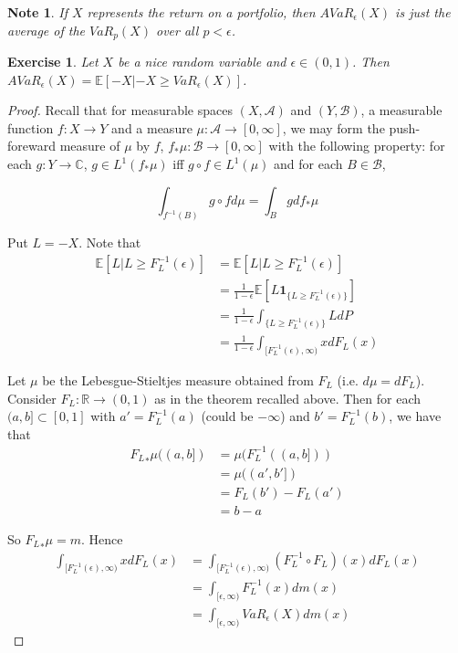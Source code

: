 \documentclass[12pt]{amsart}
\newtheorem{note}[thm]{Note}
\newtheorem{ex}[thm]{Exercise}
\newcommand{\ep}{\epsilon}
\newcommand{\C}{\mathbb{C}}
\newcommand{\E}{\mathbb{E}}
\newcommand{\R}{\mathbb{R}}
\newcommand{\MA}{\mathcal{A}}
\newcommand{\MB}{\mathcal{B}}
\newcommand{\RG}{[0,\infty]}
\begin{document}
\begin{note}
If $X$ represents the return on a portfolio, then $AVaR_{\ep}(X)$ is just the average of the $VaR_{p}(X)$ over all $p< \ep$.
\end{note}

\begin{ex}
Let $X$ be a nice random variable and $\ep \in (0,1)$. Then $AVaR_{\ep}(X) = \E[-X|-X \geq VaR_{\ep}(X)]$.
\end{ex}

\begin{proof}
Recall that for measurable spaces $(X,\MA)$ and $(Y, \MB)$, a measurable function $f:X \rightarrow Y$ and a measure $\mu:\MA \rightarrow \RG$, we may form the push-foreward measure of $\mu$ by $f$, $f_{*}\mu:\MB \rightarrow \RG$ with the following property: for each $g:Y \rightarrow \C$, $g \in L^1(f_* \mu)$ iff  $g \circ f \in L^1(\mu)$ and for each $B \in \MB$, 

$$\int_{f^{-1}(B)}g \circ f d\mu = \int_B g d f_*\mu$$

Put $L = -X$. Note that 
\begin{align*}
\E[L|L \geq F^{-1}_{L}(\ep)] 
&= \E[L|L \geq F^{-1}_{L}(\ep)] \\ 
&= \frac{1}{1-\ep}\E [L\mathbf{1}_{\{L \geq F^{-1}_{L}(\ep)\}}] \\ 
&=  \frac{1}{1-\ep} \int_{\{L \geq F_{L}^{-1}(\ep)\}}LdP \\
& = \frac{1}{1-\ep} \int_{[F_{L}^{-1}(\ep),  \infty)}xd F_{L}(x)
\end{align*}

Let $\mu$ be the Lebesgue-Stieltjes measure obtained from $F_L$ (i.e. $d \mu = dF_{L}$). Consider $F_{L}: \R \rightarrow (0,1)$ as in the theorem recalled above. Then for each $(a,b] \subset [0,1]$ with $a' =  F_{L}^{-1}(a)$ (could be $-\infty$) and $b' = F_{L}^{-1}(b)$, we have that 
\begin{align*}
{F_{L}}_{*} \mu ((a,b]) 
&= \mu(F^{-1}_{L}((a,b]))\\
&= \mu((a', b']) \\ 
&= F_{L}(b') - F_{L}(a')\\
&= b-a
\end{align*}

So ${F_L}_{*} \mu = m$. Hence  
\begin{align*}
\int_{[F_{L}^{-1}(\ep),  \infty)}xd F_L(x) 
&= \int_{[F_{L}^{-1}(\ep),  \infty)}(F^{-1}_L \circ F_L) (x)d F_L(x) \\
&= \int_{[\ep,  \infty)} F^{-1}_L(x)dm(x)\\
&= \int_{[\ep,  \infty)} VaR_{\ep}(X)dm(x)
\end{align*}
\end{proof}
\end{document}

